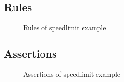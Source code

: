 \subsection{Rules}\label{sec:rules}

\begin{figure}[h]
\begin{framed}

\begin{alltt}
\end{alltt}

\end{framed}
  \caption{Rules of speedlimit example}\label{fig:rules}
\end{figure}



\subsection{Assertions}\label{sec:assertions}

\begin{figure}[h]
\begin{framed}

\begin{alltt}
\end{alltt}

\end{framed}
  \caption{Assertions of speedlimit example}\label{fig:assertions}
\end{figure}




